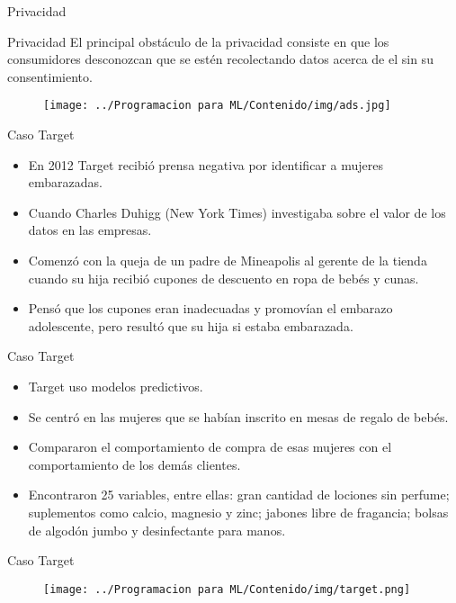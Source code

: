 \documentclass[11pt,aspectratio=169]{beamer}
\begin{document}
\begin{frame}{Privacidad}
\begin{block}{Privacidad}
El principal obstáculo de la privacidad consiste en que los consumidores desconozcan que se estén recolectando datos acerca de el sin su consentimiento.
\end{block}
\end{frame}

\begin{frame}{}
\begin{figure}[H]
	\centering
	\texttt{[image: ../Programacion para ML/Contenido/img/ads.jpg]}
\end{figure}
\end{frame}

\begin{frame}{Caso Target}
\begin{itemize}
	\item En 2012 Target recibió prensa negativa por identificar a mujeres embarazadas.\pause
	\item Cuando Charles Duhigg (New York Times) investigaba sobre el valor de los datos en las empresas.\pause
	\item Comenzó con la queja de un padre de Mineapolis al gerente de la tienda cuando su hija recibió cupones de descuento  en ropa de bebés y cunas.\pause
	\item Pensó que los cupones eran inadecuadas y promovían el embarazo adolescente, pero resultó que su hija  si estaba embarazada.\pause
\end{itemize}
\end{frame}

\begin{frame}{Caso Target}
\begin{itemize}
	\item Target uso modelos predictivos.\pause
	\item Se centró en las mujeres que se habían inscrito en mesas de regalo de bebés.\pause
	\item Compararon el comportamiento de compra de esas mujeres con el comportamiento de los demás clientes.\pause
	\item Encontraron 25 variables, entre ellas:  gran cantidad de lociones sin perfume; suplementos como calcio, magnesio y zinc; jabones libre de fragancia; 
		bolsas de algodón jumbo y desinfectante para manos.
\end{itemize}
\end{frame}

\begin{frame}{Caso Target}
\begin{figure}[H]
	\centering
	\texttt{[image: ../Programacion para ML/Contenido/img/target.png]}
\end{figure}
\end{frame}
\end{document}
